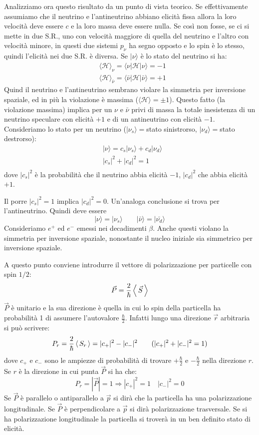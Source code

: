 Analizziamo ora questo risultato da un punto di vista teorico. Se effettivamente assumiamo che il neutrino e l'antineutrino abbiano elicità fissa allora la loro velocità deve essere $c$
e la loro  massa deve essere nulla. Se così non fosse, se ci si mette in due S.R., uno con velocità maggiore di quella del neutrino e l'altro con velocità minore, in questi due sistemi $p_{\nu}$
ha segno opposto e lo spin è lo stesso, quindi l'elicità nei due S.R. è diversa. Se $|\nu\rangle$ è lo stato del neutrino si ha:
\begin{align*}
&\langle\mathcal{H}\rangle_{\nu}=\langle\nu|\mathcal{H}|\nu\rangle=-1\\
&\langle\mathcal{H}\rangle_{\bar{\nu}}=\langle\bar{\nu}|\mathcal{H}|\bar{\nu}\rangle=+1
\end{align*}
Quind il neutrino e l'antineutrino sembrano violare la simmetria per inversione spaziale, ed in più la violazione è massima ($\langle\mathcal{H}\rangle=\pm1$).
Questo fatto (la violazione massima) implica per un $\nu$ e $\bar{\nu}$ privi di massa la totale inesistenza di un neutrino speculare con elicità $+1$
e di un antineutrino con elicità $-1$. Consideriamo lo stato per un neutrino ($|\nu_s\rangle=$stato sinistrorso, $|\nu_d\rangle=$stato destrorso):
\begin{align*}
&|\nu\rangle=c_s|\nu_s\rangle+c_d|\nu_d\rangle\\
&|c_s|^2+|c_d|^2=1\\
\end{align*}
dove $|c_s|^2$ è la probabilità che il neutrino abbia elicità $-1$, $|c_d|^2$ che abbia elicità $+1$.

Il porre $|c_s|^2=1$ implica $|c_d|^2=0$. Un'analoga conclusione si trova per l'antineutrino. Quindi deve essere
\[
|\nu\rangle=|\nu_s\rangle\qquad |\bar{\nu}\rangle=|\bar{\nu_d}\rangle
\]
Consideriamo $e^+$ ed $e^-$ emessi nei decadimenti $\beta$. Anche questi violano
la simmetria per inversione spaziale, nonostante il nucleo iniziale sia simmetrico per inversione
spaziale.

A questo punto conviene introdurre il vettore di polarizzazione per particelle con spin $1/2$:
\[
  \vec{P}=\frac{2}{\hbar}\left\langle\, \vec{S} \,\right\rangle
\]
$\vec{P}$ è unitario e la sua direzione è quella in cui lo spin della particella ha probabilità 1 di assumere l'autovalore $\frac{\hbar}{2}$. Infatti lungo una direzione $\vec{r}$ arbitraria
si può scrivere:
\[
  P_r=\frac{2}{\hbar}\left\langle\, S_r \,\right\rangle=|c_+|^2-|c_-|^2\qquad (|c_+|^2+|c_-|^2=1)
\]
dove $c_+$ e $c_-$ sono le ampiezze di probabilità di trovare $+\frac{\hbar}{2}$ e $-\frac{\hbar}{2}$ nella direzione $r$. Se $r$ è la direzione in cui punta $\vec{P}$ si ha che:
\[
P_r=|\vec{P}|=1\Rightarrow|c_+|^2=1\quad|c_-|^2=0
\]
Se $\vec{P}$ è parallelo o antiparallelo a $\vec{p}$ si dirà che la particella ha una polarizzazione longitudinale. Se $\vec{P}$ è perpendicolare a $\vec{p}$ si dirà
polarizzazione trasversale. Se si ha polarizzazione longitudinale la particella si troverà in un ben definito stato di elicità.
